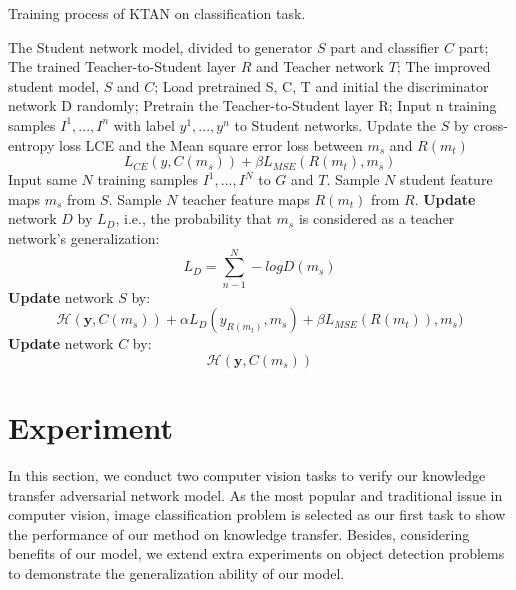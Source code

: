 \documentclass[letterpaper]{article} %
\begin{document}
\begin{algorithm}[htb!]
	\caption{Training process of KTAN on classification task.}
	\label{alg:process}
	\begin{algorithmic}
		\Require
		The Student network model, divided to generator $S$ part and classifier $C$ part;
		The trained Teacher-to-Student layer $R$ and Teacher network $T$;
		\Ensure
		The improved student model, $S$ and $C$;
		\State Load pretrained S, C, T and initial the discriminator network D randomly;
		Pretrain the Teacher-to-Student layer R;
		\State Input n training samples ${I^1,...,I^n}$ with label ${y^1,...,y^n}$ to Student networks.
		\State Update the $S$ by cross-entropy loss LCE and the Mean square error loss between $m_s$ and $R(m_t)$
		\begin{equation*}
		L_{CE}(y,C(m_s))+\beta L_{MSE}(R(m_t),m_s)
		\end{equation*}
		\EndFor
		\State Input same $N$ training samples ${I^{1},...,I^{N}}$ to $G$ and $T$.
		\State Sample $N$ student feature maps $m_{s}$ from $S$.
		\State Sample $N$ teacher feature maps $R(m_{t})$ from $R$.
		\State \textbf{Update} network $D$ by $L_{D}$, i.e., the probability that $m_{s}$ is considered as a teacher network's generalization:
		\begin{equation*}
			L_{D}=\sum_{n-1}^{N}-logD(m_{s})
		\end{equation*}
		\State \textbf{Update} network $S$ by:
		\begin{equation*}
				\mathcal{H}(\textbf{y},C(m_{s}))+\alpha L_{D}(y_{R(m_{t})},m_{s})+\beta L_{MSE}(R(m_{t})),m_{s})
		\end{equation*}
		\State \textbf{Update} network $C$ by:
		\begin{equation*}
			\mathcal{H}(\textbf{y},C(m_{s}))
		\end{equation*}
		\EndFor
	\end{algorithmic}
\end{algorithm}

\section{Experiment}

In this section, we conduct two computer vision tasks to verify our knowledge transfer adversarial network model. As the most popular and traditional issue in computer vision, image classification problem is selected as our first task to show the performance of our method on knowledge transfer. Besides, considering benefits of our model, we extend extra experiments on object detection problems to demonstrate the generalization ability of our model.
\end{document}
